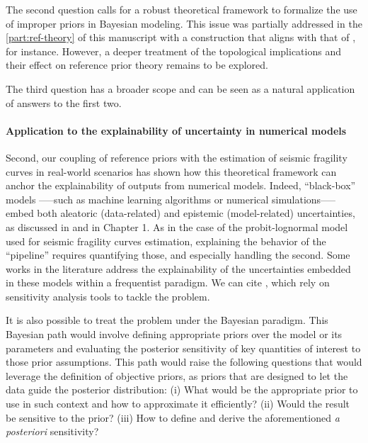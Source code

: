 The second question calls for a robust theoretical framework to formalize the use of improper priors in Bayesian modeling. This issue was partially addressed in the \cref{part:ref-theory} of this manuscript with a construction that aligns with that of \citet{bioche_approximation_2015}, for instance. However, a deeper treatment of the topological implications and their effect on reference prior theory remains to be explored.

The third question has a broader scope
and can be seen as a natural application of answers to the first two. %



\paragraph{Application to the explainability of uncertainty in numerical models}

Second, our coupling of reference priors with the estimation of seismic fragility curves in real-world scenarios has shown how this theoretical framework can anchor the explainability of outputs from numerical models. Indeed, ``black-box'' models —--such as machine learning algorithms or numerical simulations—-- embed both aleatoric (data-related) and epistemic (model-related) uncertainties, as discussed in \cite{hullermeier_aleatoric_2019} and in Chapter 1.
As in the case of the probit-lognormal model used for seismic fragility curves estimation, explaining the behavior of the ``pipeline'' requires quantifying those, and especially handling the second. %
Some works in the literature address the explainability of the uncertainties embedded in these
models within a frequentist paradigm. We can cite
\cite{il_idrissi_quantile-constrained_2024,wimmer_quantifying_2023}, which rely on
sensitivity analysis tools to tackle the problem.

It is also possible to treat the problem under the Bayesian paradigm.
This Bayesian path would involve defining appropriate priors over the model or its parameters and evaluating the posterior sensitivity of key quantities of interest to those prior assumptions. This path would raise the following questions that would leverage the definition
of objective priors, as priors that are designed to let the data guide the posterior distribution:
(i) What would be the appropriate prior to use in such context
and how to approximate it efficiently? (ii) 
Would the result be sensitive to the prior?
(iii) How to define and derive the aforementioned \emph{a posteriori} sensitivity?

